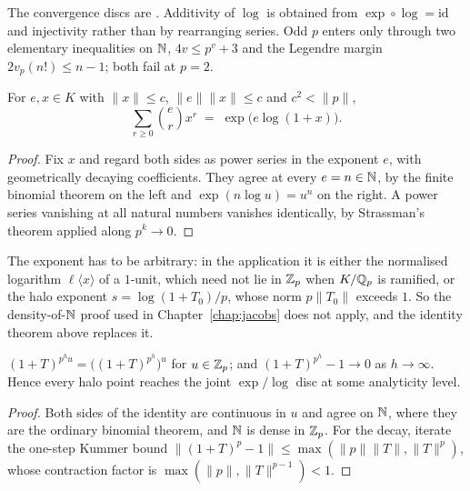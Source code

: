 The convergence discs are \cite[Chapter IV \S2]{Koblitz}.  Additivity of $\log$ is obtained from
$\exp\circ\log = \mathrm{id}$ and injectivity rather than by rearranging series.  Odd $p$ enters
only through two elementary inequalities on $\mathbb{N}$, $4v\leq p^{v}+3$ and the Legendre margin
$2v_p(n!)\leq n-1$; both fail at $p=2$.

\begin{theorem}
  \label{thm:padic-binomial}
  \leanok
  For $e, x \in K$ with $\lVert x\rVert\leq c$, $\lVert e\rVert\lVert x\rVert\leq c$ and
  $c^{2}<\lVert p\rVert$,
  \[
    \sum_{r\geq 0}\binom{e}{r}x^{r} \;=\; \exp\bigl(e\log(1+x)\bigr).
  \]
\end{theorem}

\begin{proof}
  \leanok
  Fix $x$ and regard both sides as power series in the exponent $e$, with geometrically decaying
  coefficients.  They agree at every $e = n \in \mathbb{N}$, by the finite binomial theorem on the left
  and $\exp(n\log u) = u^{n}$ on the right.  A power series vanishing at all natural numbers
  vanishes identically, by Strassman's theorem applied along $p^{k}\to 0$.
\end{proof}

The exponent has to be arbitrary: in the application it is either the normalised logarithm
$\ell\langle x\rangle$ of a $1$-unit, which need not lie in $\mathbb{Z}_p$ when $K/\mathbb{Q}_p$ is ramified, or
the halo exponent $s = \log(1+T_0)/p$, whose norm $p\lVert T_0\rVert$ exceeds $1$.  So the
density-of-$\mathbb{N}$ proof used in Chapter~\ref{chap:jacobs} does not apply, and the identity theorem
above replaces it.

\begin{lemma}
  \label{lem:pow-sub-one}
  \leanok
  $(1+T)^{p^{h}u} = \bigl((1+T)^{p^{h}}\bigr)^{u}$ for $u\in\mathbb{Z}_p$; and
  $(1+T)^{p^{h}} - 1 \to 0$ as $h\to\infty$.  Hence every halo point reaches the joint
  $\exp/\log$ disc at some analyticity level.
\end{lemma}

\begin{proof}
  \leanok
  Both sides of the identity are continuous in $u$ and agree on $\mathbb{N}$, where they are the ordinary
  binomial theorem, and $\mathbb{N}$ is dense in $\mathbb{Z}_p$.  For the decay, iterate the one-step Kummer bound
  $\lVert (1+T)^{p}-1\rVert \leq \max(\lVert p\rVert\lVert T\rVert, \lVert T\rVert^{p})$, whose
  contraction factor is $\max(\lVert p\rVert, \lVert T\rVert^{p-1})<1$.
\end{proof}

